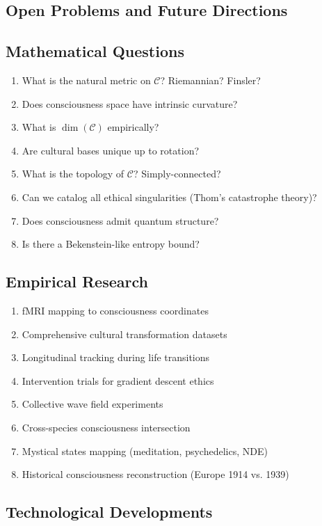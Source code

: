 \documentclass[11pt,a4paper]{article}
\theoremstyle{definition}
\theoremstyle{remark}
\newcommand{\CC}{\mathcal{C}}
\begin{document}
\begin{small}
\section{Open Problems and Future Directions}

\subsection{Mathematical Questions}

\begin{enumerate}[label=\textbf{Q\arabic*:}]
\item What is the natural metric on $\CC$? Riemannian? Finsler?
\item Does consciousness space have intrinsic curvature?
\item What is $\dim(\CC)$ empirically?
\item Are cultural bases unique up to rotation?
\item What is the topology of $\CC$? Simply-connected?
\item Can we catalog all ethical singularities (Thom's catastrophe theory)?
\item Does consciousness admit quantum structure?
\item Is there a Bekenstein-like entropy bound?
\end{enumerate}

\subsection{Empirical Research}

\begin{enumerate}[label=\textbf{E\arabic*:}]
\item fMRI mapping to consciousness coordinates
\item Comprehensive cultural transformation datasets
\item Longitudinal tracking during life transitions
\item Intervention trials for gradient descent ethics
\item Collective wave field experiments
\item Cross-species consciousness intersection
\item Mystical states mapping (meditation, psychedelics, NDE)
\item Historical consciousness reconstruction (Europe 1914 vs. 1939)
\end{enumerate}

\subsection{Technological Developments}


\end{small}
\end{document}
